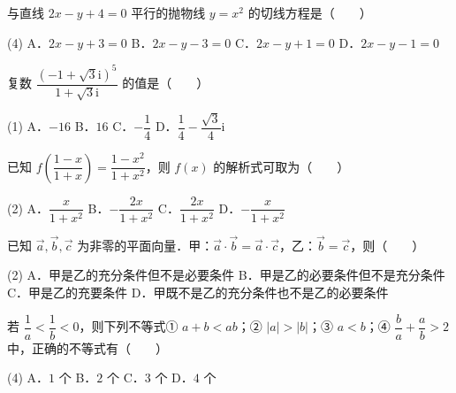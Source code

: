 

\begin{question}
与直线 $2x - y + 4 = 0$ 平行的抛物线 $y = x^2$ 的切线方程是\mbox{（　　）}

\begin{gkopts}(4)
\task A．$2x - y + 3 = 0$
\task B．$2x - y - 3 = 0$
\task C．$2x - y + 1 = 0$
\task D．$2x - y - 1 = 0$
\end{gkopts}

\end{question}
\begin{question}
复数 $\dfrac{(-1 + \sqrt{3}\mathrm{i})^5}{1 + \sqrt{3}\mathrm{i}}$ 的值是\mbox{（　　）}

\begin{gkopts}(1)
\task A．$-16$
\task B．$16$
\task C．$-\dfrac{1}{4}$
\task D．$\dfrac{1}{4} - \dfrac{\sqrt{3}}{4}\mathrm{i}$
\end{gkopts}

\end{question}
\begin{question}
已知 $f\left(\dfrac{1 - x}{1 + x}\right) = \dfrac{1 - x^2}{1 + x^2}$，则 $f(x)$ 的解析式可取为\mbox{（　　）}

\begin{gkopts}(2)
\task A．$\dfrac{x}{1 + x^2}$
\task B．$-\dfrac{2x}{1 + x^2}$
\task C．$\dfrac{2x}{1 + x^2}$
\task D．$-\dfrac{x}{1 + x^2}$
\end{gkopts}

\end{question}
\begin{question}
已知 $\vec{a}, \vec{b}, \vec{c}$ 为非零的平面向量．甲：$\vec{a} \cdot \vec{b} = \vec{a} \cdot \vec{c}$，乙：$\vec{b} = \vec{c}$，则\mbox{（　　）}

\begin{gkopts}(2)
\task A．甲是乙的充分条件但不是必要条件
\task B．甲是乙的必要条件但不是充分条件
\task C．甲是乙的充要条件
\task D．甲既不是乙的充分条件也不是乙的必要条件
\end{gkopts}

\end{question}
\begin{question}
若 $\dfrac{1}{a} < \dfrac{1}{b} < 0$，则下列不等式① $a + b < ab$；② $|a| > |b|$；③ $a < b$；④ $\dfrac{b}{a} + \dfrac{a}{b} > 2$ 中，正确的不等式有\mbox{（　　）}

\begin{gkopts}(4)
\task A．$1$ 个
\task B．$2$ 个
\task C．$3$ 个
\task D．$4$ 个
\end{gkopts}

\end{question}

